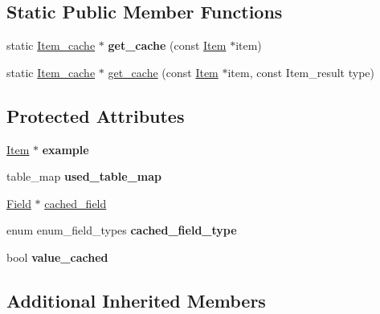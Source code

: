 \subsection*{Static Public Member Functions}
\begin{DoxyCompactItemize}
\item 
\mbox{\label{classItem__cache_ad38cad13633276eb753b7bcb7acad1be}} 
static \mbox{\hyperlink{classItem__cache}{Item\+\_\+cache}} $\ast$ {\bfseries get\+\_\+cache} (const \mbox{\hyperlink{classItem}{Item}} $\ast$item)
\item 
static \mbox{\hyperlink{classItem__cache}{Item\+\_\+cache}} $\ast$ \mbox{\hyperlink{classItem__cache_aa6e85d7732bbd77c6beb7ad76c5b21ec}{get\+\_\+cache}} (const \mbox{\hyperlink{classItem}{Item}} $\ast$item, const Item\+\_\+result type)
\end{DoxyCompactItemize}
\subsection*{Protected Attributes}
\begin{DoxyCompactItemize}
\item 
\mbox{\label{classItem__cache_acb3961600ba26abfda6f46adf0deefd1}} 
\mbox{\hyperlink{classItem}{Item}} $\ast$ {\bfseries example}
\item 
\mbox{\label{classItem__cache_a5863166cd719da6adb7fa63f14c27d0b}} 
table\+\_\+map {\bfseries used\+\_\+table\+\_\+map}
\item 
\mbox{\hyperlink{classField}{Field}} $\ast$ \mbox{\hyperlink{classItem__cache_a026458858e814775ab27f048c46cf348}{cached\+\_\+field}}
\item 
\mbox{\label{classItem__cache_adffa360eee72ccb80886c9ea51199282}} 
enum enum\+\_\+field\+\_\+types {\bfseries cached\+\_\+field\+\_\+type}
\item 
\mbox{\label{classItem__cache_a9502c1d595aa3fb89317fa53fc259654}} 
bool {\bfseries value\+\_\+cached}
\end{DoxyCompactItemize}
\subsection*{Additional Inherited Members}


